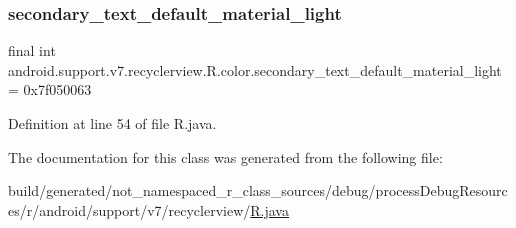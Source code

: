 \subsubsection{\texorpdfstring{secondary\_text\_default\_material\_light}{secondary\_text\_default\_material\_light}}
{\footnotesize\ttfamily final int android.\+support.\+v7.\+recyclerview.\+R.\+color.\+secondary\+\_\+text\+\_\+default\+\_\+material\+\_\+light = 0x7f050063\hspace{0.3cm}{\ttfamily [static]}}



Definition at line 54 of file R.\+java.



The documentation for this class was generated from the following file\+:\begin{DoxyCompactItemize}
\item 
build/generated/not\+\_\+namespaced\+\_\+r\+\_\+class\+\_\+sources/debug/process\+Debug\+Resources/r/android/support/v7/recyclerview/\mbox{\hyperlink{android_2support_2v7_2recyclerview_2_r_8java}{R.\+java}}\end{DoxyCompactItemize}

